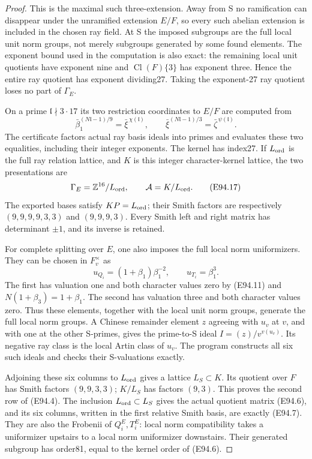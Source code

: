 \begin{proof}
This is the maximal such three-extension. Away
from S no ramification can disappear under the
unramified extension \(E/F\), so every such
abelian extension is included in the chosen ray
field. At S the imposed subgroups are the full
local unit norm groups, not merely subgroups
generated by some found elements.
The exponent bound used in the computation is
also exact: the remaining local unit quotients
have exponent nine and \(\operatorname{Cl}(F)\{3\}\)
has exponent three. Hence the entire ray quotient
has exponent dividing27. Taking the exponent-27
ray quotient loses no part of \(\Gamma_E\).

On a prime \(\mathfrak l\nmid3\cdot17\) its
two restriction coordinates to \(E/F\) are
computed from
\[
 \bar\beta_1^{(N\mathfrak l-1)/9}
       =\bar\xi^{\,\chi(\mathfrak l)},\qquad
 \bar\xi^{(N\mathfrak l-1)/3}
       =\bar\zeta^{\,\psi(\mathfrak l)} .
 \tag{E94.16}
\]
The certificate factors actual ray basis ideals
into primes and evaluates these two equalities,
including their integer exponents. The kernel
has index27. If \(L_{\rm ord}\) is the full
ray relation lattice, and \(K\) is this
integer character-kernel lattice, the two
presentations are
\[
 \Gamma_E=\mathbb Z^{16}/L_{\rm ord},\qquad
 \mathcal A=K/L_{\rm ord}.
 \tag{E94.17}
\]
The exported bases satisfy \(KP=L_{\rm ord}\);
their Smith factors are respectively
\((9,9,9,9,3,3)\) and \((9,9,9,3)\).
Every Smith left and right matrix has determinant
\(\pm1\), and its inverse is retained.

For complete splitting over \(E\), one also
imposes the full local norm uniformizers. They
can be chosen in \(F_v^\times\) as
\[
 u_{Q_i}=(1+\beta_1)\beta_1^{-2},\qquad
 u_{T_i}=\beta_1^3 .
 \tag{E94.18}
\]
The first has valuation one and both character
values zero by (E94.11) and \(N(1+\beta_3)=1+\beta_1\).
The second has valuation three and both character
values zero. Thus these elements, together with
the local unit norm groups, generate the full
local norm groups. A Chinese remainder element
\(z\) agreeing with \(u_v\) at \(v\), and with
one at the other S-primes, gives the prime-to-S
ideal \(I=(z)/v^{v(u_v)}\). Its negative ray
class is the local Artin class of \(u_v\).
The program constructs all six such ideals
and checks their S-valuations exactly.

Adjoining these six columns to \(L_{\rm ord}\)
gives a lattice \(L_S\subset K\). Its quotient
over \(F\) has Smith factors \((9,9,3,3)\);
\(K/L_S\) has factors \((9,3)\).
This proves the second row of (E94.4).
The inclusion \(L_{\rm ord}\subset L_S\) gives
the actual quotient matrix (E94.6), and its
six columns, written in the first relative
Smith basis, are exactly (E94.7).
They are also the Frobenii of \(Q_i^E,T_i^E\):
local norm compatibility takes a uniformizer
upstairs to a local norm uniformizer downstairs.
Their generated subgroup has order81, equal
to the kernel order of (E94.6).


\end{proof}
